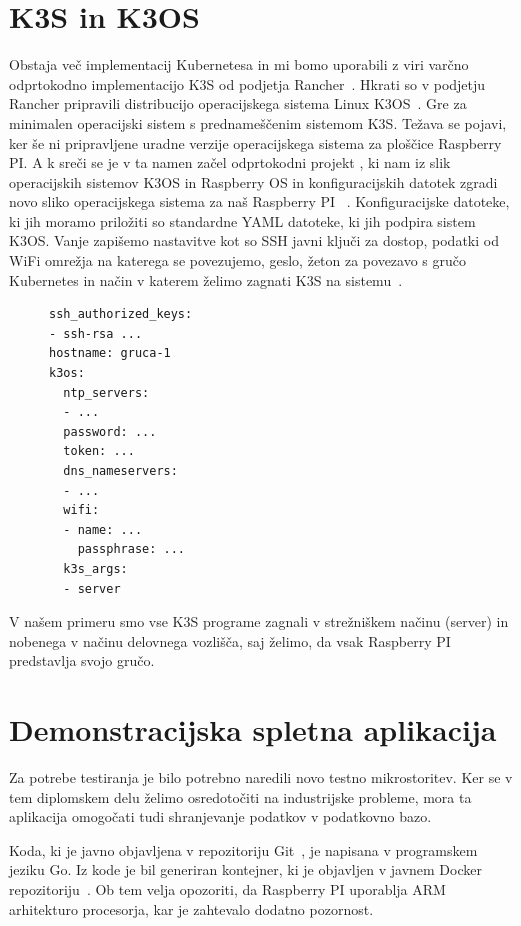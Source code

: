\documentclass[a4paper, 12pt]{book}
\begin{document}
\section{K3S in K3OS}
Obstaja več implementacij Kubernetesa in mi bomo uporabili z viri varčno odprtokodno implementacijo K3S od podjetja Rancher~\cite{k3s-info}.
Hkrati so v podjetju Rancher pripravili distribucijo operacijskega sistema Linux K3OS~\cite{k3os-git}.
Gre za minimalen operacijski sistem s prednameščenim sistemom K3S.
Te\-ža\-va se pojavi, ker še ni pripravljene uradne verzije operacijskega sistema za ploščice Raspberry PI.
A k sreči se je v ta namen začel odprtokodni projekt , ki nam iz slik operacijskih sistemov K3OS in Raspberry OS in konfiguracijskih datotek zgradi novo sliko operacijskega sistema za naš Raspberry PI ~\cite{k3os-rpi-image-generator}.
Konfiguracijske datoteke, ki jih moramo priložiti so standardne YAML datoteke, ki jih podpira sistem K3OS.
Vanje zapišemo nastavitve kot so SSH javni ključi za dostop, podatki od WiFi omrežja na katerega se povezujemo, geslo, žeton za povezavo s gručo Kubernetes in način v katerem želimo zagnati K3S na sistemu~\cite{k3os-git}.
\begin{figure}[h]
  \begin{verbatim}
ssh_authorized_keys:
- ssh-rsa ...
hostname: gruca-1
k3os:
  ntp_servers:
  - ...
  password: ...
  token: ...
  dns_nameservers:
  - ... 
  wifi:
  - name: ...
    passphrase: ...
  k3s_args:
  - server
\end{verbatim}
\end{figure}
V našem primeru smo vse K3S programe zagnali v strežniškem načinu (server) in nobenega v načinu delovnega vozlišča, saj želimo, da vsak Raspberry PI predstavlja svojo gručo.
\section{Demonstracijska spletna aplikacija}
Za potrebe testiranja je bilo potrebno naredili novo testno mikrostoritev.
Ker se v tem diplomskem delu želimo osredotočiti na industrijske probleme, mora ta aplikacija omogočati tudi shranjevanje podatkov v podatkovno bazo.

Koda, ki je javno objavljena v repozitoriju Git~\cite{git-stateful-rest-sample}, je napisana v programskem jeziku Go.
Iz kode je bil generiran kontejner, ki je objavljen v javnem Docker repozitoriju~\cite{docker-stateful-rest-sample}.
Ob tem velja opozoriti, da Raspberry PI uporablja ARM arhitekturo procesorja, kar je zahtevalo dodatno pozornost.
\end{document}
